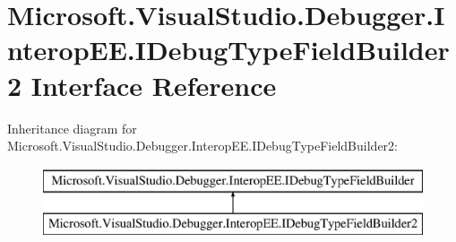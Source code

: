 \hypertarget{interface_microsoft_1_1_visual_studio_1_1_debugger_1_1_interop_e_e_1_1_i_debug_type_field_builder2}{\section{Microsoft.\+Visual\+Studio.\+Debugger.\+Interop\+E\+E.\+I\+Debug\+Type\+Field\+Builder2 Interface Reference}
\label{interface_microsoft_1_1_visual_studio_1_1_debugger_1_1_interop_e_e_1_1_i_debug_type_field_builder2}
}
Inheritance diagram for Microsoft.\+Visual\+Studio.\+Debugger.\+Interop\+E\+E.\+I\+Debug\+Type\+Field\+Builder2\+:\begin{figure}[H]
\begin{center}
\leavevmode
\includegraphics[height=2.000000cm]{interface_microsoft_1_1_visual_studio_1_1_debugger_1_1_interop_e_e_1_1_i_debug_type_field_builder2}
\end{center}
\end{figure}
